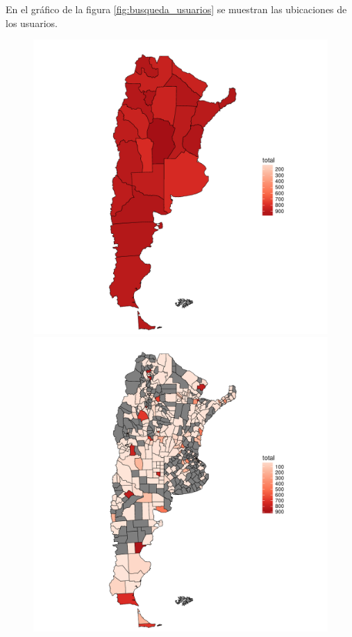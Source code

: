 En el gráfico de la figura \ref{fig:busqueda_usuarios} se muestran las ubicaciones de los usuarios.


\begin{figure}[!ht]\centering
  \begin{minipage}[t]{0.31\textwidth}
    \includegraphics[width=\linewidth]{./images/mapaprovincias.pdf}
    \caption{} 
    \label{fig:mapaProvincias} 
   \end{minipage}
   \begin{minipage}[t]{0.31\textwidth}
    \includegraphics[width=\linewidth]{./images/mapadepartamentos.pdf}

\end{minipage}
\end{figure}
